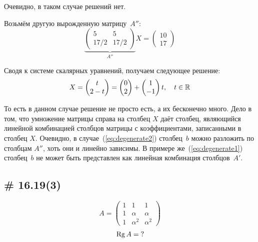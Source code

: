 \documentclass[a4paper,12pt]{article}
\begin{document}
  Очевидно, в таком случае решений нет.
  
  Возьмём другую вырожденную матрицу~$A''$:
  \begin{equation}\label{eq:degenerate2}
    \underbrace{\begin{pmatrix}
      5 & 5\\
      17/2 & 17/2
    \end{pmatrix}}_{A''} X = \begin{pmatrix}
      10\\
      17
    \end{pmatrix}
  \end{equation}
  
  Сводя к системе скалярных уравнений, получаем следующее решение:
  \[
    X = \begin{pmatrix}
      t\\
      2 - t
    \end{pmatrix}
    = \begin{pmatrix}
      0\\
      2
    \end{pmatrix} + \begin{pmatrix}
      1\\
      -1
    \end{pmatrix} t, \quad t \in \operatorname{\mathbb R}
  \]
  
  То есть в данном случае решение не просто есть, а их бесконечно много.
  Дело в том, что умножение матрицы справа на столбец $X$ даёт столбец, являющийся линейной комбинацией столбцов матрицы с коэффициентами, записанными в столбец $X$.
  Очевидно, в случае~(\ref{eq:degenerate2}) столбец~$b$ можно разложить по столбцам $A''$, хоть они и линейно зависимы.
  В примере же~(\ref{eq:degenerate1}) столбец~$b$ не может быть представлен как линейная комбинация столбцов~$A'$.
  
  
  
  \subsection{\# 16.19(3)}
  
  \[
    A = \begin{pmatrix}
      1 & 1 & 1\\
      1 & \alpha & \alpha\\
      1 & \alpha^2 & \alpha^2
    \end{pmatrix}
  \]
  \[
    \operatorname{Rg} A = \operatorname{?}
  \]
  
\end{document}
